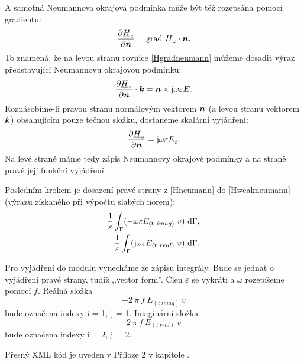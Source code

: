 \documentclass[12pt,a4paper,oneside]{article}
\numberwithin{equation}{section} %
\numberwithin{figure}{section} %
\numberwithin{table}{section} %
\newcommand{\mj}{\mathrm{j}} %
\renewcommand{\vec}[1]{\mbox{\boldmath$#1$}} %
\newcommand{\faz}[1]{{\underline{#1}}} %
\newcommand{\grad}{\mathrm{grad}\ }
\begin{document}
A samotná Neumannova okrajová podmínka může být též rozepsána pomocí gradientu:
\begin{equation}
\label{Hgradneumann}
\frac{\partial \faz{H}_z}{\partial \vec{n}} = \grad \faz{H}_z \cdot \vec{n} .
\end{equation}
To znamená, že na levou stranu rovnice \ref{Hgradneumann} můžeme dosadit výraz představující Neumannovu okrajovou podmínku:
\begin{equation}
\label{NeumannHKvek}
\frac{\partial \faz{H}_z}{\partial \vec{n}} \cdot \vec{k} = \vec{n} \times \mj \omega \varepsilon \faz{\vec{E}}.
\end{equation}
Roznásobíme-li pravou stranu normálovým vektorem $\vec{n}$ (a levou stranu vektorem $\vec{k}$) obsahujícím pouze tečnou složku, dostaneme skalární vyjádření:
\begin{equation}
\label{Hneumann}
\frac{\partial \faz{H}_z}{\partial \vec{n}} = \mj \omega \varepsilon \faz{E}_t .
\end{equation}
Na levé straně máme tedy zápis Neumannovy okrajové podmínky a na straně pravé její funkční vyjádření.

Posledním krokem je dosazení pravé strany z \ref{Hneumann} do \ref{Hweakneumann} (výrazu získaného při výpočtu slabých norem):
\begin{subequations}
\begin{align}
\frac{1}{\varepsilon} \int _{\Gamma} (- \omega \varepsilon E_{(t~imag)} ~ v ) ~ \ud \Gamma ,
\\ 
\frac{1}{\varepsilon} \int _{\Gamma} (\mj \omega \varepsilon E_{(t~real)} ~ v ) ~ \ud \Gamma .
\end{align}
\end{subequations}

Pro vyjádření do modulu vynecháme ze zápisu integrály. Bude se jednat o vyjádření pravé strany, tudíž ,,vector form''. Člen $\varepsilon$ se vykrátí a $\omega$ rozepíšeme pomocí $f$. Reálná složka  
\begin{equation}
- 2 ~ \pi ~ f ~ E_{(t~imag)} ~ v
\end{equation} 
bude označena indexy i = 1, j = 1. Imaginární složka 
\begin{equation}
2 ~ \pi ~ f ~ E_{(t~real)} ~ v
\end{equation}
bude označena indexy i = 2, j = 2.

Přesný XML kód je uveden v Příloze 2 v kapitole .
\end{document}
